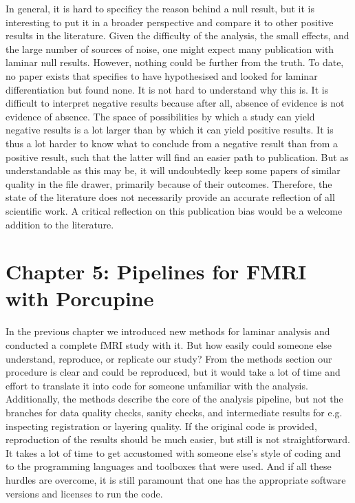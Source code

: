 In general, it is hard to specificy the reason behind a null result, but it is interesting to put it in a broader perspective and compare it to other positive results in the literature. Given the difficulty of the analysis, the small effects, and the large number of sources of noise, one might expect many publication with laminar null results. However, nothing could be further from the truth. To date, no paper exists that specifies to have hypothesised and looked for laminar differentiation but found none. %
It is not hard to understand why this is. It is difficult to interpret negative results because after all, absence of evidence is not evidence of absence. The space of possibilities by which a study can yield negative results is a lot larger than by which it can yield positive results. It is thus a lot harder to know what to conclude from a negative result than from a positive result, such that the latter will find an easier path to publication. But as understandable as this may be, it will undoubtedly keep some papers of similar quality in the file drawer, primarily because of their outcomes. Therefore, the state of the literature does not necessarily provide an accurate reflection of all scientific work. A critical reflection on this publication bias would be a welcome addition to the literature. 

\section*{Chapter 5: Pipelines for FMRI with Porcupine}
In the previous chapter we introduced new methods for laminar analysis and conducted a complete fMRI study with it. But how easily could someone else understand, reproduce, or replicate our study? From the methods section our procedure is clear and could be reproduced, but it would take a lot of time and effort to translate it into code for someone unfamiliar with the analysis. Additionally, the methods describe the core of the analysis pipeline, but not the branches for data quality checks, sanity checks, and intermediate results for e.g. inspecting registration or layering quality. If the original code is provided, reproduction of the results should be much easier, but still is not straightforward. It takes a lot of time to get accustomed with someone else's style of coding and to the programming languages and toolboxes that were used. And if all these hurdles are overcome, it is still paramount that one has the appropriate software versions and licenses to run the code. 

